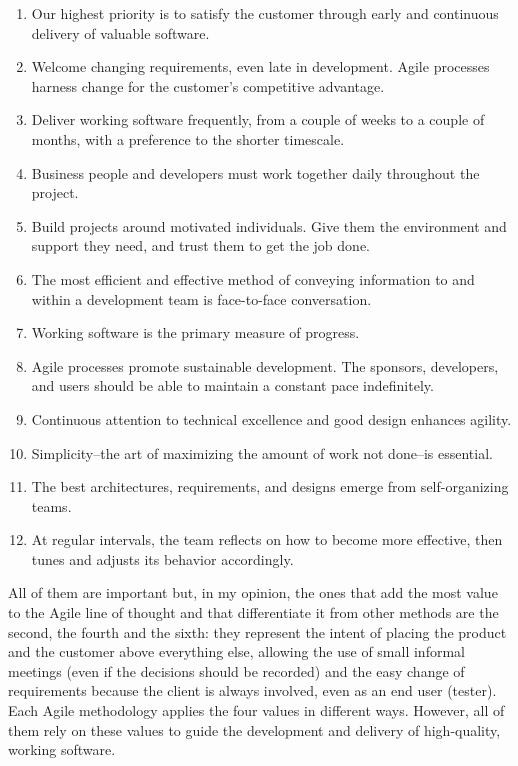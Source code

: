 	\begin{enumerate}
		\item Our highest priority is to satisfy the customer through early and continuous delivery of valuable software.
		\item Welcome changing requirements, even late in development. Agile processes harness change for the customer's competitive advantage.
		\item Deliver working software frequently, from a couple of weeks to a couple of months, with a preference to the shorter timescale.
		\item Business people and developers must work together daily throughout the project.	
		\item Build projects around motivated individuals. Give them the environment and support they need, and trust them to get the job done.
		\item The most efficient and effective method of conveying information to and within a development team is face-to-face conversation.
		\item Working software is the primary measure of progress.
		\item Agile processes promote sustainable development. The sponsors, developers, and users should be able to maintain a constant pace indefinitely.	
		\item Continuous attention to technical excellence and good design enhances agility.
		\item Simplicity--the art of maximizing the amount of work not done--is essential.
		\item The best architectures, requirements, and designs emerge from self-organizing teams.
		\item At regular intervals, the team reflects on how to become more effective, then tunes and adjusts its behavior accordingly.
	\end{enumerate}
	All of them are important but, in my opinion, the ones that add the most value to the Agile line of thought and that differentiate it from other methods are the second, the fourth and the sixth: they represent the intent of placing the product and the customer above everything else, allowing the use of small informal meetings (even if the decisions should be recorded) and the easy change of requirements because the client is always involved, even as an end user (tester).\\
	Each Agile methodology applies the four values in different ways.
	However, all of them rely on these values to guide the development and delivery of high-quality, working software\cite{4-values-of-the-agile-manifesto}.

